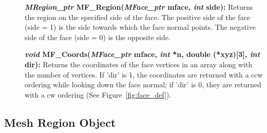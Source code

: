 \documentclass[12pt]{article}
\begin{document}
\begin{description}
\item[]\textbf{\textit{MRegion\_ptr} MF\_Region(\textit{MFace\_ptr} mface,
\textit{int} side):} Returns the region on the specified side of the
face. The positive side of the face (side = 1) is the side towards
which the face normal points. The negative side of the face (side = 0)
is the opposite side.

\item[]\textbf{\textit{void} MF\_Coords(\textit{MFace\_ptr} mface,
\textit{int} *n, double (*xyz)[3], \textit{int} dir):} Returns the
coordinates of the face vertices in an array along with the number of
vertices. If 'dir' is 1, the coordinates are returned with a  ccw
ordering while looking down the face normal; if 'dir' is 0, they are
returned with a cw ordering (See Figure~\ref{fig:face_def}).
\end{description}

\newpage
\subsection{Mesh Region Object}
\end{document}
